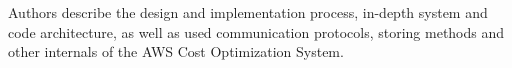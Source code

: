 %
%
%
%
%
%
%
%
%

Authors describe the design and implementation process, in-depth system and code architecture,
as well as used communication protocols, storing methods and other internals of the AWS Cost Optimization System.

